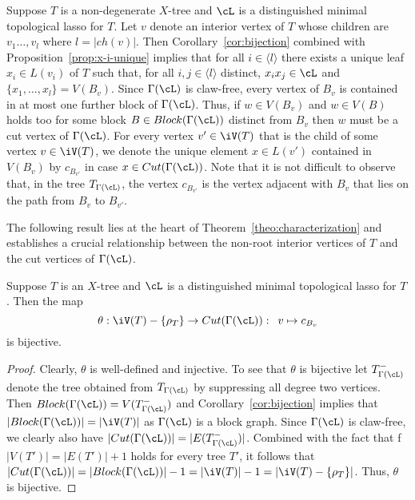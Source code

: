 Suppose $T$ is a non-degenerate $X$-tree and $\cL$ is a distinguished minimal
topological lasso for $T$.  Let $v$ denote an interior vertex of $T$ whose
children are $v_1\ldots,v_l$ where $l=|ch(v)|$. Then
Corollary~\ref{cor:bijection} combined with Proposition~\ref{prop:x-i-unique}
implies that for all $i\in\langle l\rangle$ there exists a unique leaf $x_i\in
L(v_i)$ of $T$ such that, for all $i,j\in\langle l\rangle$ distinct,
$x_ix_j\in \cL$ and $\{x_1,\ldots, x_l\}=V(B_v)$. Since $\Gamma(\cL)$ is
claw-free, every vertex of $B_v$ is contained in at most one further block of
$\Gamma(\cL)$. Thus, if $w\in V(B_v)$ and $w\in V(B) $ holds too for some
block $B\in Block(\Gamma(\cL))$ distinct from $B_v$ then $w$ must be a cut
vertex of $\Gamma(\cL)$. For every vertex $v'\in \iV(T)$ that is the child of
some vertex $v\in \iV(T)$, we denote the unique element $x\in L(v')$ contained
in $V(B_v)$ by $c_{B_{v'}}$ in case $x\in Cut(\Gamma(\cL))$.  Note that it is
not difficult to observe that, in the tree $T_{\Gamma(\cL)}$, the vertex
$c_{B_{v'}}$ is the vertex adjacent with $B_v$ that lies on the path from
$B_v$ to $B_{v'}$.

The following result lies at the heart of Theorem~\ref{theo:characterization}
and establishes a crucial relationship between the non-root interior vertices
of $T$ and the cut vertices of $\Gamma(\cL)$.

\begin{lem}
  \label{lem:bijection-theta}
  Suppose $T$ is an $X$-tree and $\cL$ is a distinguished minimal topological
  lasso for $T$. Then the map
$$
\theta :\iV(T)-\{\rho_T\} \to Cut(\Gamma(\cL)):\,\,\,v\mapsto c_{B_{v}}
$$ 
is bijective.
\end{lem}
\begin{proof}
  Clearly, $\theta$ is well-defined and injective. To see that $\theta$ is
  bijective let $ T_{\Gamma(\cL)}^-$ denote the tree obtained from $
  T_{\Gamma(\cL)}$ by suppressing all degree two vertices. Then
  $Block(\Gamma(\cL))=V(T_{\Gamma(\cL)}^-)$ and Corollary~\ref{cor:bijection}
  implies that $|Block(\Gamma(\cL))|=|\iV(T)|$ as $\Gamma(\cL)$ is a block
  graph. Since $\Gamma(\cL)$ is claw-free, we clearly also have
  $|Cut(\Gamma(\cL))|=|E(T_{\Gamma(\cL)}^-)|$. Combined with the fact that f
  $|V(T')|= |E(T')|+1$ holds for every tree $T'$, it follows that
  $|Cut(\Gamma(\cL))|=|Block(\Gamma(\cL))|-1=|\iV(T)|-1=
  |\iV(T)-\{\rho_T\}|$. Thus, $\theta$ is bijective.  \qquad
\end{proof}




